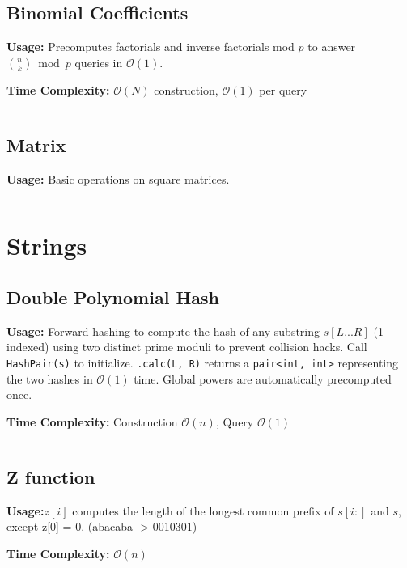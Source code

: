   \subsection{Binomial Coefficients}
    \par \textbf{Usage:} Precomputes factorials and inverse factorials mod $p$ to answer $\binom{n}{k} \bmod p$ queries in $\mathcal{O}(1)$.
    \par \textbf{Time Complexity:} $\mathcal{O}(N)$ construction, $\mathcal{O}(1)$ per query
    \inputminted{cpp}{library/maths/binomial_coefficient.hpp}
  \subsection{Matrix}
    \par \textbf{Usage:} Basic operations on square matrices.
    \inputminted{cpp}{library/maths/matrix.hpp}

\section{Strings}
  \subsection{Double Polynomial Hash}
    \par \textbf{Usage:} Forward hashing to compute the hash of any substring $s[L...R]$ (1-indexed) using two distinct prime moduli to prevent collision hacks. Call \texttt{HashPair(s)} to initialize. \texttt{.calc(L, R)} returns a \texttt{pair<int, int>} representing the two hashes in $\mathcal{O}(1)$ time. Global powers are automatically precomputed once.
    \par \textbf{Time Complexity:} Construction $\mathcal{O}(n)$, Query $\mathcal{O}(1)$
    \inputminted{cpp}{library/strings/double_hash.cpp}

  \subsection{Z function}
    \par \textbf{Usage:}$z[i]$ computes the length of the longest common prefix of $s[i:]$ and $s$, except z[0] = 0. (abacaba -> 0010301)
    \par \textbf{Time Complexity:} $\mathcal{O}(n)$
    \inputminted{cpp}{library/strings/z_function.cpp}
